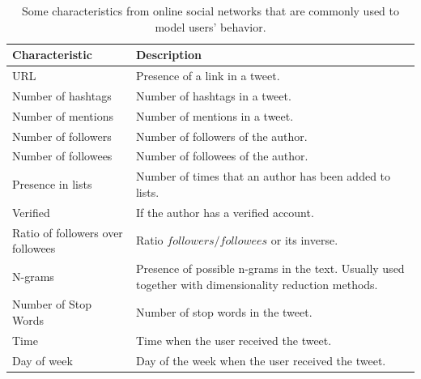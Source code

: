 \begin{table}[htbp]
	\centering
	\caption{Some characteristics from online social networks that are commonly used to model users' behavior.} 
	\tabcolsep=0.11cm
	\singlespacing
	\fontsize{7pt}{8pt}\selectfont
	\begin{tabular}{|>{\raggedright\centering\arraybackslash}m{1.5cm}|m{6.8cm}|}
		\hline
		\textbf{Characteristic} & \centering\arraybackslash \textbf{Description} \\ \hline
		URL 																								& Presence of a link in a tweet. \cite{Artzi2012,Comarela2012,Peng2011,Petrovic2011,Suh2010} \\ \hline
		Number of hashtags 																	& Number of hashtags in a tweet. \cite{Artzi2012,Comarela2012,Peng2011,Petrovic2011} \\ \hline
		Number of mentions 																	& Number of mentions in a tweet. \cite{Artzi2012,Comarela2012,Liu2013,Peng2011,Petrovic2011,Suh2010} \\ \hline
		Number of followers 																& Number of followers of the author. \cite{Artzi2012,Hong2011,Liu2013,Luo2013,Petrovic2011,Suh2010,Wang2012} \\ \hline
		Number of followees 																& Number of followees of the author. \cite{Artzi2012,Hong2011,Luo2013,Petrovic2011,Suh2010,Wang2012} \\ \hline
		Presence in lists 																	& Number of times that an author has been added to lists. \cite{Luo2013,Petrovic2011} \\ \hline
		Verified 																						& If the author has a verified account. \cite{Luo2013,Petrovic2011} \\ \hline
		Ratio of followers over followees												& Ratio $followers/followees$ or its inverse. \cite{Artzi2012,Peng2011} \\ \hline
		N-grams 																						& Presence of possible n-grams in the text. Usually used together with dimensionality reduction methods. \cite{Artzi2012,Petrovic2011} \\ \hline
		Number of Stop Words 																& Number of stop words in the tweet. \cite{Artzi2012} \\ \hline
		Time 																								& Time when the user received the tweet. \cite{Artzi2012,Liu2013} \\ \hline
		Day of week 																				& Day of the week when the user received the tweet. \cite{Artzi2012} \\ \hline

\end{tabular}
\end{table}
